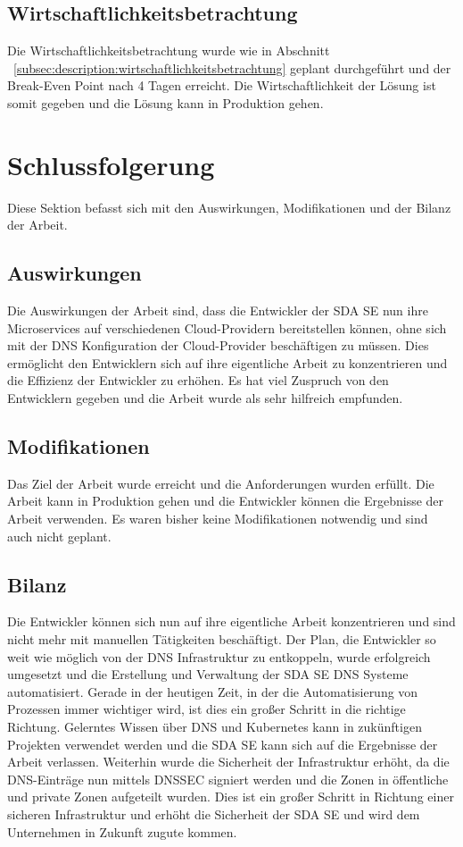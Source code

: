 \subsection{Wirtschaftlichkeitsbetrachtung}
\label{subsec:description:ergebnisse:wirtschaftlichkeitsbetrachtung}
Die Wirtschaftlichkeitsbetrachtung wurde wie in Abschnitt ~\ref{subsec:description:wirtschaftlichkeitsbetrachtung} geplant durchgeführt und der Break-Even Point nach 4 Tagen erreicht.
Die Wirtschaftlichkeit der Lösung ist somit gegeben und die Lösung kann in Produktion gehen.

\section{Schlussfolgerung}
\label{sec:description:schlussfolgerung}
Diese Sektion befasst sich mit den Auswirkungen, Modifikationen und der Bilanz der Arbeit.

\subsection{Auswirkungen}
\label{subsec:description:auswirkungen}
Die Auswirkungen der Arbeit sind, dass die Entwickler der SDA SE nun ihre Microservices auf verschiedenen Cloud-Providern bereitstellen können, ohne sich mit der DNS Konfiguration der Cloud-Provider beschäftigen zu müssen.
Dies ermöglicht den Entwicklern sich auf ihre eigentliche Arbeit zu konzentrieren und die Effizienz der Entwickler zu erhöhen.
Es hat viel Zuspruch von den Entwicklern gegeben und die Arbeit wurde als sehr hilfreich empfunden.

\subsection{Modifikationen}
\label{subsec:description:modifikationen}
Das Ziel der Arbeit wurde erreicht und die Anforderungen wurden erfüllt.
Die Arbeit kann in Produktion gehen und die Entwickler können die Ergebnisse der Arbeit verwenden.
Es waren bisher keine Modifikationen notwendig und sind auch nicht geplant.

\subsection{Bilanz}
\label{subsec:description:bilanz}
Die Entwickler können sich nun auf ihre eigentliche Arbeit konzentrieren und sind nicht mehr mit manuellen Tätigkeiten beschäftigt.
Der Plan, die Entwickler so weit wie möglich von der DNS Infrastruktur zu entkoppeln, wurde erfolgreich umgesetzt und die Erstellung und Verwaltung der SDA SE DNS Systeme automatisiert.
Gerade in der heutigen Zeit, in der die Automatisierung von Prozessen immer wichtiger wird, ist dies ein großer Schritt in die richtige Richtung.
Gelerntes Wissen über DNS und Kubernetes kann in zukünftigen Projekten verwendet werden und die SDA SE kann sich auf die Ergebnisse der Arbeit verlassen.
Weiterhin wurde die Sicherheit der Infrastruktur erhöht, da die DNS-Einträge nun mittels DNSSEC signiert werden und die Zonen in öffentliche und private Zonen aufgeteilt wurden.
Dies ist ein großer Schritt in Richtung einer sicheren Infrastruktur und erhöht die Sicherheit der SDA SE und wird dem Unternehmen in Zukunft zugute kommen.
